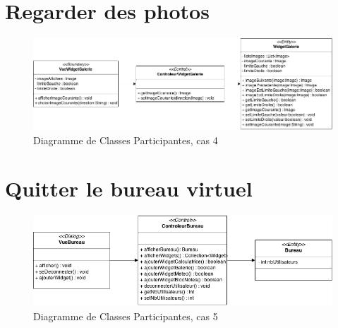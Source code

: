 \section{Regarder des photos}

\begin{figure}[H]
	\centering
	\includegraphics[scale=0.4]{diagrammes/DCP4.png}
	\caption{Diagramme de Classes Participantes, cas 4}
\end{figure}

\section{Quitter le bureau virtuel}

\begin{figure}[H]
	\centering
	\includegraphics[scale=0.4]{diagrammes/DCP5.png}
	\caption{Diagramme de Classes Participantes, cas 5}
\end{figure}